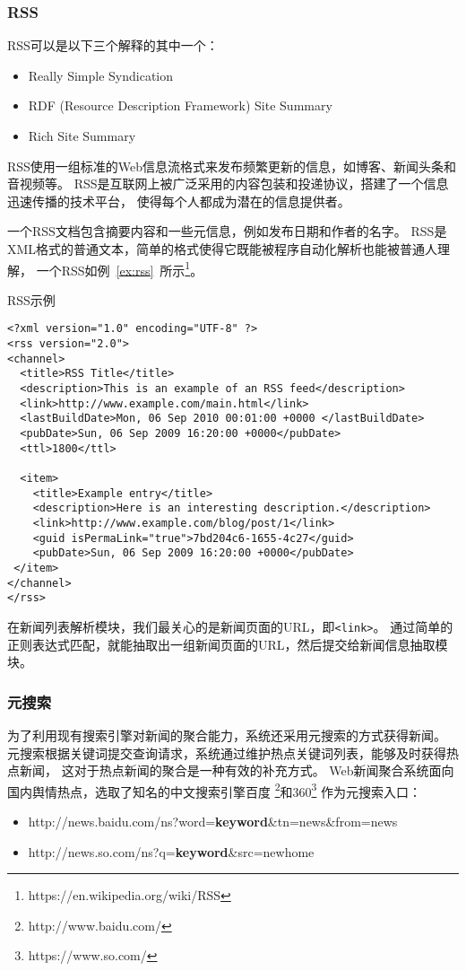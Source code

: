 \subsubsection{RSS}
RSS可以是以下三个解释的其中一个：
\begin{itemize}
\item Really Simple Syndication
\item RDF (Resource Description Framework) Site Summary
\item Rich Site Summary
\end{itemize}

RSS使用一组标准的Web信息流格式来发布频繁更新的信息，如博客、新闻头条和音视频等。
RSS是互联网上被广泛采用的内容包装和投递协议，搭建了一个信息迅速传播的技术平台，
使得每个人都成为潜在的信息提供者。

一个RSS文档包含摘要内容和一些元信息，例如发布日期和作者的名字。
RSS是XML格式的普通文本，简单的格式使得它既能被程序自动化解析也能被普通人理解，
一个RSS如例~\ref{ex:rss}~所示\footnote{https://en.wikipedia.org/wiki/RSS}。

\begin{example}
\label{ex:rss}
RSS示例
\end{example}
\begin{oframed}
\begin{verbatim}
<?xml version="1.0" encoding="UTF-8" ?>
<rss version="2.0">
<channel>
  <title>RSS Title</title>
  <description>This is an example of an RSS feed</description>
  <link>http://www.example.com/main.html</link>
  <lastBuildDate>Mon, 06 Sep 2010 00:01:00 +0000 </lastBuildDate>
  <pubDate>Sun, 06 Sep 2009 16:20:00 +0000</pubDate>
  <ttl>1800</ttl>

  <item>
    <title>Example entry</title>
    <description>Here is an interesting description.</description>
    <link>http://www.example.com/blog/post/1</link>
    <guid isPermaLink="true">7bd204c6-1655-4c27</guid>
    <pubDate>Sun, 06 Sep 2009 16:20:00 +0000</pubDate>
 </item>
</channel>
</rss>
\end{verbatim}
\end{oframed}

在新闻列表解析模块，我们最关心的是新闻页面的URL，即\texttt{<link>}。
通过简单的正则表达式匹配，就能抽取出一组新闻页面的URL，然后提交给新闻信息抽取模块。

\subsubsection{元搜索}
为了利用现有搜索引擎对新闻的聚合能力，系统还采用元搜索的方式获得新闻。
元搜索根据关键词提交查询请求，系统通过维护热点关键词列表，能够及时获得热点新闻，
这对于热点新闻的聚合是一种有效的补充方式。
Web新闻聚合系统面向国内舆情热点，选取了知名的中文搜索引擎百度
\footnote{http://www.baidu.com/}和360\footnote{https://www.so.com/}
作为元搜索入口：
\begin{itemize}
\item http://news.baidu.com/ns?word=\textbf{keyword}\&tn=news\&from=news
\item http://news.so.com/ns?q=\textbf{keyword}\&src=newhome
\end{itemize}

